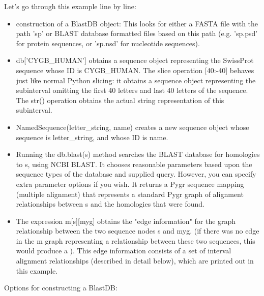 \documentclass{howto}
\begin{document}
Let's go through this example line by line:

\begin{itemize}

\item    
construction of a BlastDB object: This looks for either a FASTA file with the path 'sp' or BLAST database formatted files based on this path (e.g. 'sp.psd' for protein sequences, or 'sp.nsd' for nucleotide sequences).

\item
db['CYGB_HUMAN'] obtains a sequence object representing the SwissProt sequence whose ID is CYGB_HUMAN.  The slice operation [40:-40] behaves just like normal Python slicing: it obtains a sequence object representing the subinterval omitting the first 40 letters and last 40 letters of the sequence.  The str() operation obtains the actual string representation of this subinterval.

\item
NamedSequence(letter_string, name) creates a new sequence object whose sequence is letter_string, and whose ID is name.

\item
Running the db.blast(s) method searches the BLAST database for homologies to s, using NCBI BLAST.  It chooses reasonable parameters based upon the sequence types of the database and supplied query.  However, you can specify extra parameter options if you wish.  It returns a Pygr sequence mapping (multiple alignment) that represents a standard Pygr graph of alignment relationships between s and the homologies that were found.

\item
The expression m[s][myg] obtains the "edge information" for the graph relationship between the two sequence nodes s and myg.  (if there was no edge in the m graph representing a relationship between these two sequences, this would produce a 
).  This edge information consists of a set of interval alignment relationships (described in detail below), which are printed out in this example.

\end{itemize}

Options for constructing a BlastDB:
\end{document}
